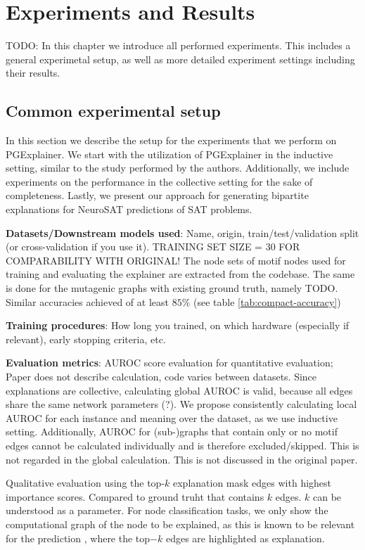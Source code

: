 \chapter{Experiments and Results}
\label{ch:Experiments}

TODO: In this chapter we introduce all performed experiments. This includes a general experimetal setup, as well as more detailed experiment settings including their results.

\section{Common experimental setup}
In this section we describe the setup for the experiments that we perform on PGExplainer. We start with the utilization of PGExplainer in the inductive setting, similar to the study performed by the authors. Additionally, we include experiments on the performance in the collective setting for the sake of completeness. Lastly, we present our approach for generating bipartite explanations for NeuroSAT \cite{} predictions of SAT problems.



\textbf{Datasets/Downstream models used}: Name, origin, train/test/validation split (or cross-validation if you use it). TRAINING SET SIZE = 30 FOR COMPARABILITY WITH ORIGINAL! The node sets of motif nodes used for training and evaluating the explainer are extracted from the codebase. The same is done for the mutagenic graphs with existing ground truth, namely TODO. Similar accuracies achieved of at least $85\%$ (see table \ref{tab:compact-accuracy})

\textbf{Training procedures}: How long you trained, on which hardware (especially if relevant), early stopping criteria, etc.

\textbf{Evaluation metrics}: AUROC score evaluation for quantitative evaluation; Paper does not describe calculation, code varies between datasets. Since explanations are collective, calculating global AUROC is valid, because all edges share the same network parameters (?). We propose consistently calculating local AUROC for each instance and meaning over the dataset, as we use inductive setting. Additionally, AUROC for (sub-)graphs that contain only or no motif edges cannot be calculated individually and is therefore excluded/skipped. This is not regarded in the global calculation. This is not discussed in the original paper.

Qualitative evaluation using the top-$k$ explanation mask edges with highest importance scores. Compared to ground truht that contains $k$ edges. $k$ can be understood as a parameter. For node classification tasks, we only show the computational graph of the node to be explained, as this is known to be relevant for the prediction \cite{}, where the top$-k$ edges are highlighted as explanation.

